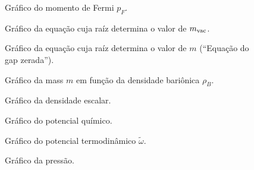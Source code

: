 \FloatBarrier


\begin{figure}
	
	\caption{Gráfico do momento de Fermi $p_F$. \protect}
	\label{Fig:fermi_momentum_NJL-D_1}
\end{figure}

\begin{figure}
	
	\caption{Gráfico da equação cuja raíz determina o valor de $m_{\rm{vac}}$. \protect}
	\label{Fig:vacuum_mass_equation_NJL-D_1}
\end{figure}

\begin{figure}
	
	\caption{Gráfico da equação cuja raíz determina o valor de $m$ (``Equação do gap zerada''). \protect}
	\label{Fig:gap_NJL-D_1}
\end{figure}

\begin{figure}
	
	\caption{Gráfico da mass $m$ em função da densidade bariônica $\rho_B$. \protect}
	\label{Fig:mass_NJL-D_1}
\end{figure}


\begin{figure}
	
	\caption{Gráfico da densidade escalar. \protect}
	\label{Fig:scalar_density_NJL-D_1}
\end{figure}

\begin{figure}
	
	\caption{Gráfico do potencial químico. \protect}
	\label{Fig:chemical_potential_NJL-D_1}
\end{figure}

\begin{figure}
	
	\caption{Gráfico do potencial termodinâmico $\tilde{\omega}$. \protect}
	\label{Fig:thermodynamic_potential_NJL-D_1}
\end{figure}

\begin{figure}
	
	\caption{Gráfico da pressão. \protect}
	\label{Fig:pressure_NJL-D_1}
\end{figure}

